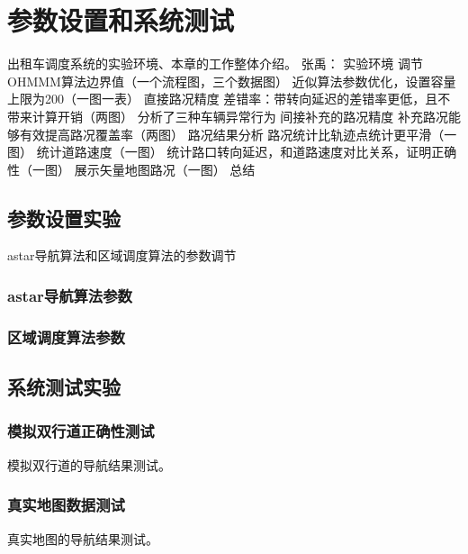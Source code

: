 \chapter{参数设置和系统测试}
出租车调度系统的实验环境、本章的工作整体介绍。
张禹：
实验环境
调节OHMMM算法边界值（一个流程图，三个数据图）
近似算法参数优化，设置容量上限为200（一图一表）
直接路况精度
  差错率：带转向延迟的差错率更低，且不带来计算开销（两图）
  分析了三种车辆异常行为
间接补充的路况精度
  补充路况能够有效提高路况覆盖率（两图）
路况结果分析
  路况统计比轨迹点统计更平滑（一图）
  统计道路速度（一图）
  统计路口转向延迟，和道路速度对比关系，证明正确性（一图）
  展示矢量地图路况（一图）
总结



\section{参数设置实验}
astar导航算法和区域调度算法的参数调节
\subsection{astar导航算法参数}
\subsection{区域调度算法参数}

\section{系统测试实验}

\subsection{模拟双行道正确性测试}
模拟双行道的导航结果测试。
\subsection{真实地图数据测试}
真实地图的导航结果测试。